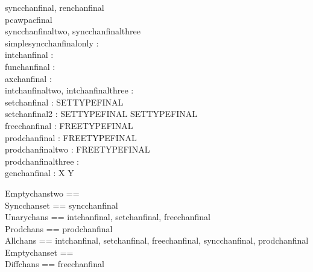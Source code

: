 \begin{circus}
 \circchannel syncchanfinal, renchanfinal \\
 \circchannel pcawpacfinal \\
 \circchannel syncchanfinaltwo, syncchanfinalthree \\
 \circchannel simplesyncchanfinalonly : \nat \\
 \circchannel intchanfinal : \nat \\
 \circchannel funchanfinal : \nat \\
 \circchannel axchanfinal : \nat \\
 \circchannel intchanfinaltwo, intchanfinalthree : \nat \\
 \circchannel setchanfinal : SETTYPEFINAL \\
 \circchannel setchanfinal2 : SETTYPEFINAL \cross SETTYPEFINAL \\
 \circchannel freechanfinal : FREETYPEFINAL \\
 \circchannel prodchanfinal : \nat \cross FREETYPEFINAL \\
 \circchannel prodchanfinaltwo : \nat \cross FREETYPEFINAL \\
 \circchannel prodchanfinalthree : \nat \cross \nat \cross \nat \\
 \circchannel [X, Y] genchanfinal : X \cross Y \\
\end{circus}

\begin{circus}
 \circchannelset Emptychanstwo == \lchanset \rchanset \\
 \circchannelset Syncchanset == \lchanset syncchanfinal \rchanset \\
 \circchannelset Unarychans == \lchanset intchanfinal, setchanfinal, freechanfinal \rchanset \\
 \circchannelset Prodchans == \lchanset prodchanfinal \rchanset \\
 \circchannelset Allchans == \lchanset intchanfinal, setchanfinal, freechanfinal, syncchanfinal, prodchanfinal \rchanset \\%
 \circchannelset Emptychanset == \lchanset \rchanset \\ %
 \circchannelset Diffchans == \lchanset freechanfinal \rchanset \\%
\end{circus}


